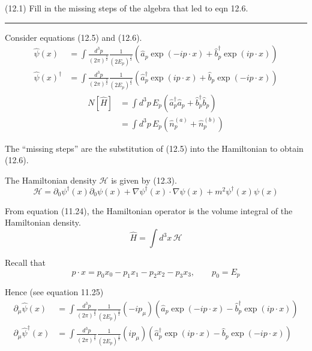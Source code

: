 \documentclass[12pt]{article}
\begin{document}
(12.1)
Fill in the missing steps of the algebra that led to
eqn 12.6.

\bigskip
\hrule

\bigskip
Consider equations (12.5) and (12.6).
\begin{equation*}
\begin{aligned}
\hat\psi(x)&=\int\frac{d^3p}{(2\pi)^\frac{3}{2}}\frac{1}{(2E_p)^\frac{1}{2}}
\left(\hat a_p\exp(-ip\cdot x)+\hat b_p^\dag\exp(ip\cdot x)\right)
\\
\hat\psi(x)^\dag&=\int\frac{d^3p}{(2\pi)^\frac{3}{2}}\frac{1}{(2E_p)^\frac{1}{2}}
\left(\hat a_p^\dag\exp(ip\cdot x)+\hat b_p\exp(-ip\cdot x)\right)
\end{aligned}
\tag{12.5}
\end{equation*}
\begin{equation*}
\begin{aligned}
N[\hat H]&=\int d^3p\,E_p\left(\hat a_p^\dag\hat a_p+\hat b_p^\dag\hat b_p\right)
\\
&=\int d^3p\,E_p\left(\hat n_p^{(a)}+\hat n_p^{(b)}\right)
\end{aligned}
\tag{12.6}
\end{equation*}

The ``missing steps'' are the substitution of (12.5) into the Hamiltonian to obtain (12.6).

\bigskip
The Hamiltonian density $\mathcal H$ is given by (12.3).
\begin{equation*}
\mathcal H=\partial_0\psi^\dag(x)\partial_0\psi(x)+\nabla\psi^\dag(x)\cdot\nabla\psi(x)+m^2\psi^\dag(x)\psi(x)
\tag{12.3}
\end{equation*}

From equation (11.24), the Hamiltonian operator is the volume integral of the Hamiltonian density.
\begin{equation*}
\hat H=\int d^3x\,\mathcal H
\end{equation*}

Recall that
\begin{equation*}
p\cdot x=p_0x_0-p_1x_1-p_2x_2-p_3x_3,\qquad p_0=E_p
\end{equation*}

Hence (see equation 11.25)
\begin{equation*}
\begin{aligned}
\partial_\mu\hat\psi(x)
&=\int\frac{d^3p}{(2\pi)^\frac{3}{2}}\frac{1}{(2E_p)^\frac{1}{2}}(-ip_\mu)
\left(\hat a_p\exp(-ip\cdot x)-\hat b_p^\dag\exp(ip\cdot x)\right)
\\
\partial_\mu\hat\psi^\dag(x)
&=\int\frac{d^3p}{(2\pi)^\frac{3}{2}}\frac{1}{(2E_p)^\frac{1}{2}}(ip_\mu)
\left(\hat a_p^\dag\exp(ip\cdot x)-\hat b_p\exp(-ip\cdot x)\right)
\end{aligned}
\end{equation*}
\end{document}
